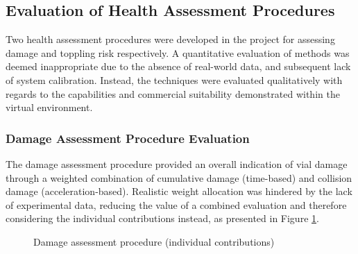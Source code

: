 \documentclass[10pt]{article}
\begin{document}
\subsection{Evaluation of Health Assessment Procedures}
Two health assessment procedures were developed in the project for assessing damage and toppling risk respectively. A quantitative evaluation of methods was deemed inappropriate due to the absence of real-world data, and subsequent lack of system calibration. Instead, the techniques were evaluated qualitatively with regards to the capabilities and commercial suitability demonstrated within the virtual environment.

\subsubsection{Damage Assessment Procedure Evaluation}
The damage assessment procedure provided an overall indication of vial damage through a weighted combination of cumulative damage (time-based) and collision damage (acceleration-based). Realistic weight allocation was hindered by the lack of experimental data, reducing the value of a combined evaluation and therefore considering the individual contributions instead, as presented in Figure \ref{fig:analysis_damage_master}.


\begin{figure}[h]%
    \centering
    \qquad %
    \qquad %
    \caption{Damage assessment procedure (individual contributions)}
    \label{fig:analysis_damage_master}%
\end{figure}
\end{document}
